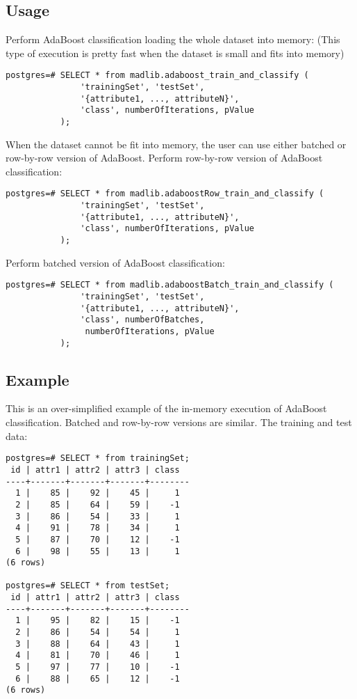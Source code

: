 \subsection*{Usage}
Perform AdaBoost classification loading the whole dataset into memory: (This type of execution is pretty fast when the dataset is small and fits into memory)

\begin{verbatim}
postgres=# SELECT * from madlib.adaboost_train_and_classify (
               'trainingSet', 'testSet', 
               '{attribute1, ..., attributeN}', 
               'class', numberOfIterations, pValue
           );
\end{verbatim}

When the dataset cannot be fit into memory, the user can use either batched or row-by-row version of AdaBoost.
\vspace{\baselineskip}
{\raggedleft Perform row-by-row version of AdaBoost classification:}

\begin{verbatim}
postgres=# SELECT * from madlib.adaboostRow_train_and_classify (
               'trainingSet', 'testSet', 
               '{attribute1, ..., attributeN}', 
               'class', numberOfIterations, pValue
           );
\end{verbatim}

{\raggedleft Perform batched version of AdaBoost classification:}

\begin{verbatim}
postgres=# SELECT * from madlib.adaboostBatch_train_and_classify (
               'trainingSet', 'testSet', 
               '{attribute1, ..., attributeN}', 
               'class', numberOfBatches,
                numberOfIterations, pValue
           );
\end{verbatim}

\subsection*{Example}
This is an over-simplified example of the in-memory execution of AdaBoost classification. Batched and row-by-row versions are similar.
\vspace{\baselineskip}
{\raggedleft The training and test data:}

\begin{verbatim}
postgres=# SELECT * from trainingSet;
 id | attr1 | attr2 | attr3 | class 
----+-------+-------+-------+--------
  1 |    85 |    92 |    45 |     1 
  2 |    85 |    64 |    59 |    -1 
  3 |    86 |    54 |    33 |     1 
  4 |    91 |    78 |    34 |     1 
  5 |    87 |    70 |    12 |    -1 
  6 |    98 |    55 |    13 |     1 
(6 rows)

postgres=# SELECT * from testSet;
 id | attr1 | attr2 | attr3 | class 
----+-------+-------+-------+--------
  1 |    95 |    82 |    15 |    -1 
  2 |    86 |    54 |    54 |     1 
  3 |    88 |    64 |    43 |     1 
  4 |    81 |    70 |    46 |     1 
  5 |    97 |    77 |    10 |    -1 
  6 |    88 |    65 |    12 |    -1 
(6 rows)
\end{verbatim}

